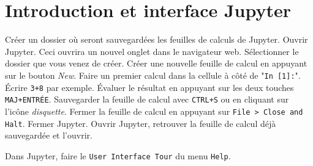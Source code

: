 
\section{Introduction et interface Jupyter}

\begin{exercice}
    Créer un dossier où seront sauvegardées les feuilles de calculs de Jupyter.
    Ouvrir Jupyter. Ceci ouvrira un nouvel onglet dans le navigateur web.
    Sélectionner le dossier que vous venez de créer.
    Créer une nouvelle feuille de calcul en appuyant sur le bouton \emph{New}.
    Faire un premier calcul dans la cellule à côté de "\texttt{In [1]:}".
    Écrire \texttt{3+8} par exemple. Évaluer le résultat en appuyant sur les
    deux touches \texttt{MAJ+ENTRÉE}. Sauvegarder la feuille de calcul avec
    \texttt{CTRL+S} ou en cliquant sur l'icône \emph{disquette}. Fermer la
    feuille de calcul en appuyant sur \texttt{File > Close and Halt}. Fermer
    Jupyter. Ouvrir Jupyter, retrouver la feuille de calcul déjà
    sauvegardée et l'ouvrir.
\end{exercice}

\begin{exercice}
    Dans Jupyter, faire le \texttt{User Interface Tour} du menu \texttt{Help}.
\end{exercice}


